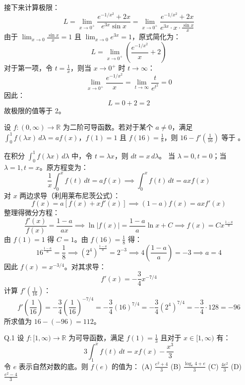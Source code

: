 \begin{questions}
\begin{solution}
    接下来计算极限：
    \[
    L = \lim_{x \to 0^+} \frac{e^{-1/x^2} + 2x}{e^{3x} \sin x} = \lim_{x \to 0^+} \frac{e^{-1/x^2} + 2x}{e^{3x} \cdot x \cdot \frac{\sin x}{x}}
    \]
    由于 $\lim_{x \to 0} \frac{\sin x}{x} = 1$ 且 $\lim_{x \to 0} e^{3x} = 1$，原式简化为：
    \[
    L = \lim_{x \to 0^+} \left( \frac{e^{-1/x^2}}{x} + 2 \right)
    \]
    对于第一项，令 $t = \frac{1}{x}$，则当 $x \to 0^+$ 时 $t \to \infty$：
    \[
    \lim_{x \to 0^+} \frac{e^{-1/x^2}}{x} = \lim_{t \to \infty} \frac{t}{e^{t^2}} = 0
    \]
    因此：
    \[
    L = 0 + 2 = 2
    \]
    故极限的值等于 2。
\end{solution}

\question
设 $f : (0, \infty) \to \mathbb{R}$ 为二阶可导函数。若对于某个 $a \neq 0$，满足 $\int_{0}^{1} f(\lambda x) \,d\lambda = a f(x)$，$f(1) = 1$ 且 $f(16) = \frac{1}{8}$，则 $16 - f' \left( \frac{1}{16} \right)$ 等于 \underline{ \quad}。

\begin{solution}
在积分 $\int_{0}^{1} f(\lambda x) \,d\lambda$ 中，令 $t = \lambda x$，则 $dt = x \,d\lambda$。
当 $\lambda = 0, t = 0$；当 $\lambda = 1, t = x$。原方程变为：
\[
\frac{1}{x} \int_{0}^{x} f(t) \,dt = a f(x) \implies \int_{0}^{x} f(t) \,dt = a x f(x)
\]
对 $x$ 两边求导（利用莱布尼茨公式）：
\[
f(x) = a [f(x) + x f'(x)] \implies (1-a) f(x) = a x f'(x)
\]
整理得微分方程：
\[
\frac{f'(x)}{f(x)} = \frac{1-a}{ax} \implies \ln |f(x)| = \frac{1-a}{a} \ln x + C \implies f(x) = C x^{\frac{1-a}{a}}
\]
由 $f(1) = 1$ 得 $C = 1$。由 $f(16) = \frac{1}{8}$ 得：
\[
16^{\frac{1-a}{a}} = \frac{1}{8} \implies (2^4)^{\frac{1-a}{a}} = 2^{-3} \implies 4 \left( \frac{1-a}{a} \right) = -3 \implies a = 4
\]
因此 $f(x) = x^{-3/4}$。对其求导：
\[
f'(x) = -\frac{3}{4} x^{-7/4}
\]
计算 $f' \left( \frac{1}{16} \right)$：
\[
f' \left( \frac{1}{16} \right) = -\frac{3}{4} \left( \frac{1}{16} \right)^{-7/4} = -\frac{3}{4} (16)^{7/4} = -\frac{3}{4} (2^4)^{7/4} = -\frac{3}{4} \cdot 128 = -96
\]
所求值为 $16 - (-96) = 112$。
\end{solution}

\question
Q.1 设 $f: [1, \infty) \to \mathbb{R}$ 为可导函数，满足 $f(1) = \frac{1}{3}$ 且对于 $x \in [1, \infty)$ 有：
\[
3 \int_{1}^{x} f(t) \,dt = x f(x) - \frac{x^3}{3}
\]
令 $e$ 表示自然对数的底。则 $f(e)$ 的值为：
(A) $\frac{e^2 + 4}{3}$ \quad (B) $\frac{\log_{e} 4 + e}{3}$ \quad (C) $\frac{4e^2}{3}$ \quad (D) $\frac{e^2 - 4}{3}$


\end{questions}
